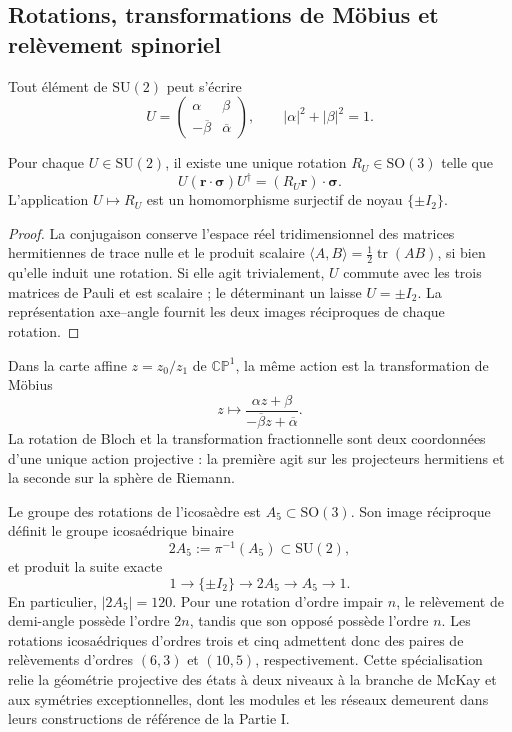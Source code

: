 \subsection{Rotations, transformations de Möbius et relèvement spinoriel}

Tout élément de \(\mathrm{SU}(2)\) peut s'écrire
\[
 U=\begin{pmatrix}
 \alpha&\beta\\-\overline\beta&\overline\alpha
 \end{pmatrix},
 \qquad |\alpha|^2+|\beta|^2=1.
\]

\begin{theorem}
\label{thm:su2-so3-bloch-rev2}
Pour chaque \(U\in\mathrm{SU}(2)\), il existe une unique rotation
\(R_U\in\mathrm{SO}(3)\) telle que
\[
 U(\boldsymbol r\cdot\boldsymbol\sigma)U^\dagger
 =(R_U\boldsymbol r)\cdot\boldsymbol\sigma.
\]
L'application \(U\mapsto R_U\) est un homomorphisme surjectif de noyau
\(\{\pm I_2\}\).
\end{theorem}

\begin{proof}
La conjugaison conserve l'espace réel tridimensionnel des matrices
hermitiennes de trace nulle et le produit scalaire
\(\langle A,B\rangle=\tfrac12\operatorname{tr}(AB)\), si bien qu'elle induit une
rotation. Si elle agit trivialement, \(U\) commute avec les trois matrices de Pauli
et est scalaire ; le déterminant un laisse \(U=\pm I_2\). La représentation
axe--angle fournit les deux images réciproques de chaque rotation.
\end{proof}

Dans la carte affine \(z=z_0/z_1\) de \(\mathbb {CP}^{1}\), la même action est
la transformation de Möbius
\[
 z\longmapsto
 \frac{\alpha z+\beta}{-\overline\beta z+\overline\alpha}.
\]
La rotation de Bloch et la transformation fractionnelle sont deux coordonnées
d'une unique action projective : la première agit sur les projecteurs hermitiens et
la seconde sur la sphère de Riemann.

Le groupe des rotations de l'icosaèdre est \(A_5\subset\mathrm{SO}(3)\). Son
image réciproque définit le groupe icosaédrique binaire
\[
 2A_5:=\pi^{-1}(A_5)\subset\mathrm{SU}(2),
\]
et produit la suite exacte
\begin{equation}
 1\longrightarrow\{\pm I_2\}
 \longrightarrow2A_5\longrightarrow A_5\longrightarrow1.
 \label{eq:extension-central-2a5-rev2}
\end{equation}
En particulier, \(|2A_5|=120\). Pour une rotation d'ordre impair \(n\), le
relèvement de demi-angle possède l'ordre \(2n\), tandis que son opposé possède
l'ordre \(n\). Les rotations icosaédriques d'ordres trois et cinq admettent donc
des paires de relèvements d'ordres \((6,3)\) et \((10,5)\),
respectivement. Cette spécialisation relie la
géométrie projective des états à deux niveaux à la branche de McKay et aux
symétries exceptionnelles, dont les modules et les réseaux demeurent dans leurs
constructions de référence de la Partie I.

